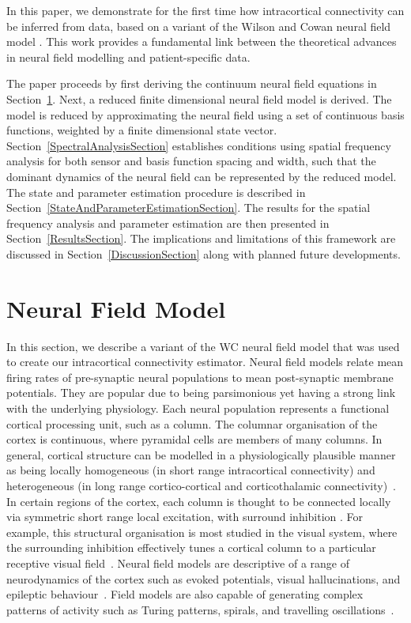 \documentclass[twocolumn,11pt,a4paper]{article}		%
\begin{document}
In this paper, we demonstrate for the first time how intracortical connectivity can be inferred from data, based on a variant of the Wilson and Cowan neural field model \cite{Wilson1973}. This work provides a fundamental link between the theoretical advances in neural field modelling and patient-specific data.

The paper proceeds by first deriving the continuum neural field equations in Section~\ref{NeuralModelSection}. Next, a reduced finite dimensional neural field model is derived. The model is reduced by approximating the neural field using a set of continuous basis functions, weighted by a finite dimensional state vector. Section~\ref{SpectralAnalysisSection} establishes conditions using spatial frequency analysis for both sensor and basis function spacing and width, such that the dominant dynamics of the neural field can be represented by the reduced model. The state and parameter estimation procedure is described in Section~\ref{StateAndParameterEstimationSection}. The results for the spatial frequency analysis and parameter estimation are then presented in Section~\ref{ResultsSection}. The implications and limitations of this framework are discussed in Section~\ref{DiscussionSection} along with planned future developments.

\section{Neural Field Model}\label{NeuralModelSection} In this section, we describe a variant of the WC neural field model that was used to create our intracortical connectivity estimator. Neural field models relate mean firing rates of pre-synaptic neural populations to mean post-synaptic membrane potentials. They are popular due to being parsimonious yet having a strong link with the underlying physiology. Each neural population represents a functional cortical processing unit, such as a column. The columnar organisation of the cortex is continuous, where pyramidal cells are members of many columns. In general, cortical structure can be modelled in a physiologically plausible manner as being locally homogeneous (in short range intracortical connectivity) and heterogeneous (in long range cortico-cortical and corticothalamic connectivity)~\cite{Jirsa2009,Qubbaj2007}. In certain regions of the cortex, each column is thought to be connected locally via symmetric short range local excitation, with surround inhibition \cite{Braitenberg1998}. For example, this structural organisation is most studied in the visual system, where the surrounding inhibition effectively tunes a cortical column to a particular receptive visual field~\cite{Sullivan2006}. Neural field models are descriptive of a range of neurodynamics of the cortex such as evoked potentials, visual hallucinations, and epileptic behaviour~\cite{David2003,Bressloff2001,Breakspear2006}. Field models are also capable of generating complex patterns of activity such as Turing patterns, spirals, and travelling oscillations~\cite{Amari1977,Coombes2005,Coombes2007}.
\end{document}

